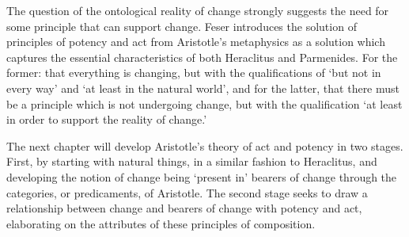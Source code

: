 The question of the ontological reality of change strongly suggests the need for some principle that can support change. Feser introduces the solution of principles of potency and act from Aristotle's metaphysics as a solution which captures the essential characteristics of both Heraclitus and Parmenides. For the former: that everything is changing, but with the qualifications of `but not in every way' and `at least in the natural world', and for the latter, that there must be a principle which is not undergoing change, but with the qualification `at least in order to support the reality of change.'

The next chapter will develop Aristotle's theory of act and potency in two stages. First, by starting with natural things, in a similar fashion to Heraclitus, and developing the notion of change being `present in' bearers of change through the categories, or predicaments, of Aristotle. The second stage seeks to draw a relationship between change and bearers of change with potency and act, elaborating on the attributes of these principles of composition.
